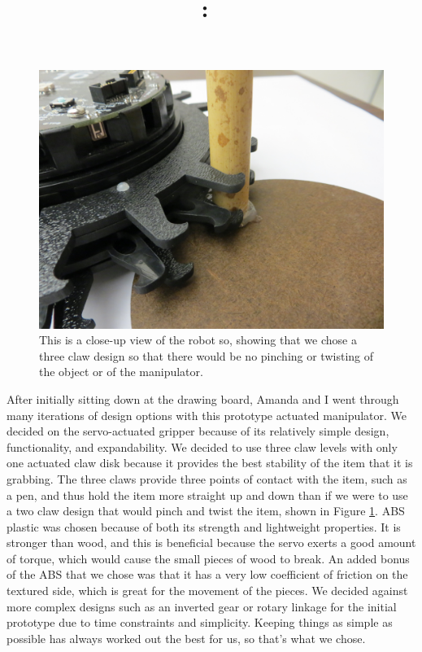 \documentclass[12pt,onecolumn]{report}
\title{\textmd{\Huge{\textbf{\hmwkTitle}}}\\
\Large{\textbf{\hmwkClass:\ \textit{\hmwkClassInstructor}}}\vspace{0.75in}
}
\author{\Large{\textbf{\hmwkAuthorName}}}
\renewcommand\thesection{\arabic{section}}
\begin{document}
\maketitle

\renewcommand*\thesection{\arabic{section}} 

\newpage
\onehalfspacing

\begin{figure}[ht]
\begin{center}
\includegraphics[width=.5\linewidth]{./Figs/close_grab.jpg}
\end{center}
\caption{This is a close-up view of the robot so, showing that we chose a three claw design so that there would be no pinching or twisting of the object or of the manipulator.}
\label{fig:Grab}
\end{figure}

After initially sitting down at the drawing board, Amanda and I went through many iterations of design options with this prototype actuated manipulator. 
We decided on the servo-actuated gripper because of its relatively simple design, functionality, and expandability. We decided to use three claw levels with only one actuated claw disk because it provides the best stability of the item that it is grabbing. The three claws provide three points of contact with the item, such as a pen, and thus hold the item more straight up and down than if we were to use a two claw design that would pinch and twist the item, shown in Figure \ref{fig:Grab}. ABS plastic was chosen because of both its strength and lightweight properties. It is stronger than wood, and this is beneficial because the servo exerts a good amount of torque, which would cause the small pieces of wood to break. An added bonus of the ABS that we chose was that it has a very low coefficient of friction on the textured side, which is great for the movement of the pieces.
We decided against more complex designs such as an inverted gear or rotary linkage for the initial prototype due to time constraints and simplicity. Keeping things as simple as possible has always worked out the best for us, so that's what we chose. 
\end{document}
